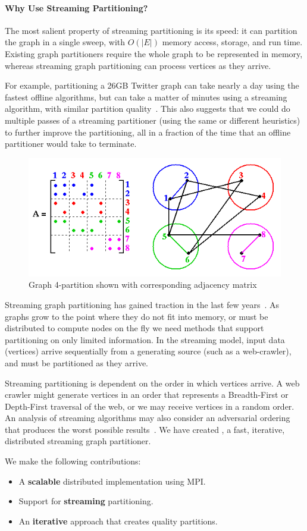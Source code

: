 \paragraph{Why Use Streaming Partitioning?}
The most salient property of streaming partitioning is its speed: it can partition the graph in a single sweep, with $O(|E|)$ memory access, storage, and run time.
Existing graph partitioners require the whole graph to be represented in memory, whereas streaming graph partitioning can process vertices as they arrive.

For example, partitioning a 26GB Twitter graph can take nearly a day using the fastest offline algorithms, but can take a matter of minutes using a streaming algorithm, with similar partition quality~\cite{tsourakakis2012fennel}.
This also suggests that we could do multiple passes of a streaming partitioner (using the same or different heuristics) to further improve the partitioning, all in a fraction of the time that an offline partitioner would take to terminate. 


\begin{figure}[h]
\centering
\includegraphics[width=0.8\columnwidth] {figures/graphpart.png}
\caption[Caption for]{Graph 4-partition shown with corresponding adjacency matrix}
\label{fig:0}
\end{figure}


Streaming graph partitioning has gained traction in the last few years~\cite{DBLP:journals/corr/abs-1212-1121,Stanton:2012:SGP:2339530.2339722,tsourakakis2012fennel}.
As graphs grow to the point where they do not fit into memory, or must be distributed to compute nodes on the fly we need methods that support partitioning on only limited information.
In the streaming model, input data (vertices) arrive sequentially from a generating source (such as a web-crawler), and must be partitioned as they arrive.

Streaming partitioning is dependent on the order in which vertices arrive.
A web crawler might generate vertices in an order that represents a Breadth-First or Depth-First traversal of the web, or we may receive vertices in a random order.
An analysis of streaming algorithms may also consider an adversarial ordering that produces the worst possible results~\cite{Stanton:2012:SGP:2339530.2339722}.
We have created \ourmethod, a fast, iterative, distributed streaming graph partitioner. 

We make the following contributions:
\begin{itemize}
\item A \textbf{scalable} distributed implementation using MPI.
\item Support for \textbf{streaming} partitioning.
\item An \textbf{iterative} approach that creates quality partitions.
\end{itemize}



